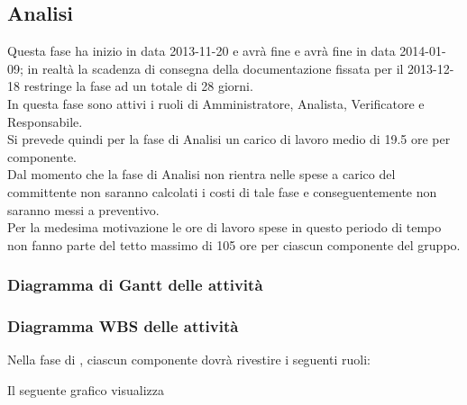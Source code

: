 \subsection{Analisi}
Questa fase ha inizio in data 2013-11-20 e avrà fine e avrà fine in data 2014-01-09; in realtà la scadenza di consegna della documentazione fissata per il 2013-12-18 restringe la fase ad un totale di 28 giorni.\\
In questa fase sono attivi i ruoli di Amministratore, Analista, Verificatore e Responsabile.\\
Si prevede quindi per la fase di Analisi un carico di lavoro medio di 19.5 ore per componente.\\
Dal momento che la fase di Analisi non rientra nelle spese a carico del committente non saranno calcolati i costi di tale fase e conseguentemente non saranno messi a preventivo.\\
Per la medesima motivazione le ore di lavoro spese in questo periodo di tempo non fanno parte del tetto massimo di 105 ore per ciascun componente del gruppo.

\subsubsection{Diagramma di Gantt delle attività}

\subsubsection{Diagramma WBS delle attività}





Nella fase di , ciascun componente dovrà rivestire i seguenti ruoli:

Il seguente grafico visualizza 
